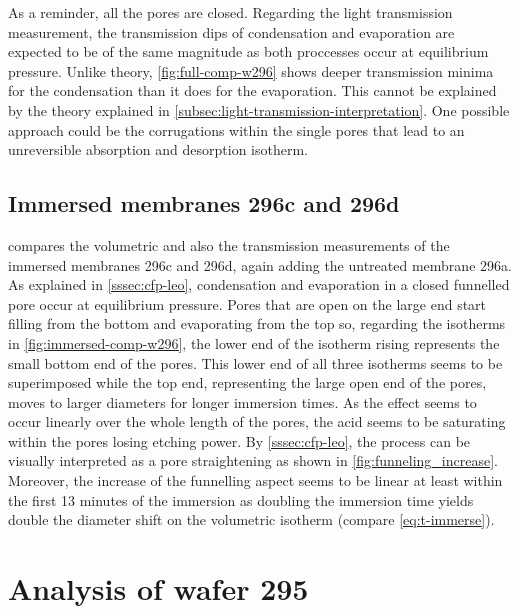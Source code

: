 \documentclass[thesis.tex]{subfiles}
\begin{document}
            As a reminder, all the pores are closed. Regarding the light transmission measurement, the transmission dips of condensation and evaporation are expected to be of the same magnitude as both proccesses occur at equilibrium pressure. Unlike theory, \cref{fig:full-comp-w296} shows deeper transmission minima for the condensation than it does for the evaporation. This cannot be explained by the theory explained in \cref{subsec:light-transmission-interpretation}. One possible approach could be the corrugations within the single pores that lead to an unreversible absorption and desorption isotherm.

            


        \subsection{Immersed membranes 296c and 296d}
        \label{subsec:immersed-membranes}

            

             compares the volumetric and also the transmission measurements of the immersed membranes 296c and 296d, again adding the untreated membrane 296a. As explained in \cref{sssec:cfp-leo}, condensation and evaporation in a closed funnelled pore occur at equilibrium pressure. Pores that are open on the large end start filling from the bottom and evaporating from the top so, regarding the isotherms in \cref{fig:immersed-comp-w296}, the lower end of the isotherm rising represents the small bottom end of the pores. This lower end of all three isotherms seems to be superimposed while the top end, representing the large open end of the pores, moves to larger diameters for longer immersion times. As the effect seems to occur linearly over the whole length of the pores, the acid seems to be saturating within the pores losing etching power. By \cref{sssec:cfp-leo}, the process can be visually interpreted as a pore straightening as shown in \cref{fig:funneling_increase}. Moreover, the increase of the funnelling aspect seems to be linear at least within the first 13 minutes of the immersion as doubling the immersion time yields double the diameter shift on the volumetric isotherm (compare \cref{eq:t-immerse}).

            


    \section{Analysis of wafer 295}
    \label{sec:wafer295}
\end{document}
